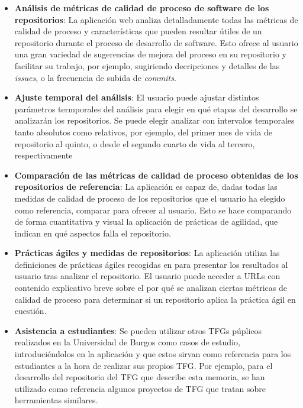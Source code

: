 \begin{itemize}
    \item \textbf{Análisis de métricas de calidad de proceso de software de los repositorios}: La aplicación web analiza detalladamente todas las métricas de calidad de proceso y características que pueden resultar útiles de un repositorio durante el proceso de desarrollo de software. Esto ofrece al usuario una gran variedad de sugerencias de mejora del proceso en su repositorio y facilitar su trabajo, por ejemplo, sugiriendo decripciones y detalles de las \textit{issues}, o la frecuencia de subida de \textit{commits}.

    \item \textbf{Ajuste temporal del análisis}: El usuario puede ajustar distintos parámetros termporales del análisis para elegir en qué etapas del desarrollo se analizarán los repositorios. Se puede elegir analizar con intervalos temporales tanto absolutos como relativos, por ejemplo, del primer mes de vida de repositorio al quinto, o desde el segundo cuarto de vida al tercero, respectivamente
    
    \item \textbf{Comparación de las métricas de calidad de proceso obtenidas de los repositorios de referencia}: La aplicación es capaz de, dadas todas las medidas de calidad de proceso de los repositorios que el usuario ha elegido como referencia, comparar para ofrecer al usuario. Esto se hace comparando de forma cuantitativa y visual la aplicación de prácticas de agilidad, que indican en qué aspectos falla el repositorio.
    
    \item \textbf{Prácticas ágiles y medidas de repositorios}: La aplicación utiliza las definiciones de prácticas ágiles recogidas en \cite{agileSubwayMap} para presentar los resultados al usuario tras analizar el repositorio. El usuario puede acceder a URLs con contenido explicativo breve sobre el por qué se analizan ciertas métricas de calidad de proceso para determinar si un repositorio aplica la práctica ágil en cuestión.

    \item \textbf{Asistencia a estudiantes}: Se pueden utilizar otros TFGs púplicos realizados en la Universidad de Burgos como casos de estudio, introduciéndolos en la aplicación y que estos sirvan como referencia para los estudiantes a la hora de realizar sus propios TFG. Por ejemplo, para el desarrollo del repositorio del TFG que describe esta memoria, se han utilizado como referencia algunos proyectos de TFG que tratan sobre herramientas similares.
    

\end{itemize}

